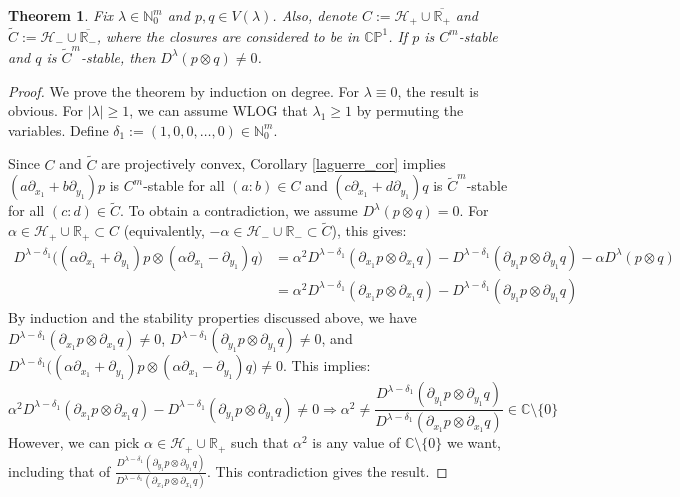 \documentclass{article}
\newtheorem{theorem}{Theorem}[section]
\theoremstyle{definition}
\theoremstyle{plain}
\newcommand{\C}{\mathbb{C}}
\newcommand{\R}{\mathbb{R}}
\newcommand{\N}{\mathbb{N}}
\newcommand{\CP}{\mathbb{CP}}
\newcommand{\UHP}{\mathcal{H}_+}
\newcommand{\LHP}{\mathcal{H}_-}
\begin{document}
\begin{theorem}\label{graces_thm}
    Fix $\lambda \in \N_0^m$ and $p,q \in V(\lambda)$. Also, denote $C := \UHP \cup \overline{\R_+}$ and $\widetilde{C} := \LHP \cup \overline{\R_-}$, where the closures are considered to be in $\CP^1$. If $p$ is $C^m$-stable and $q$ is $\widetilde{C}^m$-stable, then $D^\lambda(p \otimes q) \neq 0$.
\end{theorem}
\begin{proof}
    We prove the theorem by induction on degree. For $\lambda \equiv 0$, the result is obvious. For $|\lambda| \geq 1$, we can assume WLOG that $\lambda_1 \geq 1$ by permuting the variables. Define $\delta_1 := (1,0,0,\ldots,0) \in \N_0^m$.
    
    Since $C$ and $\widetilde{C}$ are projectively convex, Corollary \ref{laguerre_cor} implies $(a\partial_{x_1} + b\partial_{y_1})p$ is $C^m$-stable for all $(a:b) \in C$ and $(c\partial_{x_1} + d\partial_{y_1})q$ is $\widetilde{C}^m$-stable for all $(c:d) \in \widetilde{C}$. To obtain a contradiction, we assume $D^\lambda(p \otimes q) = 0$. For $\alpha \in \UHP \cup \R_+ \subset C$ (equivalently, $-\alpha \in \LHP \cup \R_- \subset \widetilde{C}$), this gives:
    \[
        \begin{split}
            D^{\lambda-\delta_1}\big((\alpha \partial_{x_1} + \partial_{y_1})p \otimes (\alpha \partial_{x_1} - \partial_{y_1})q\big) &= \alpha^2 D^{\lambda-\delta_1}(\partial_{x_1} p \otimes \partial_{x_1} q) - D^{\lambda-\delta_1}(\partial_{y_1} p \otimes \partial_{y_1} q) - \alpha D^\lambda(p \otimes q) \\
                &= \alpha^2 D^{\lambda-\delta_1}(\partial_{x_1} p \otimes \partial_{x_1} q) - D^{\lambda-\delta_1}(\partial_{y_1} p \otimes \partial_{y_1} q)
        \end{split}
    \]
    By induction and the stability properties discussed above, we have $D^{\lambda-\delta_1}(\partial_{x_1} p \otimes \partial_{x_1} q) \neq 0$, $D^{\lambda-\delta_1}(\partial_{y_1} p \otimes \partial_{y_1} q) \neq 0$, and $D^{\lambda-\delta_1}\big((\alpha \partial_{x_1} + \partial_{y_1})p \otimes (\alpha \partial_{x_1} - \partial_{y_1})q\big) \neq 0$. This implies:
    \[
        \alpha^2 D^{\lambda-\delta_1}(\partial_{x_1} p \otimes \partial_{x_1} q) - D^{\lambda-\delta_1}(\partial_{y_1} p \otimes \partial_{y_1} q) \neq 0 \Longrightarrow \alpha^2 \neq \frac{D^{\lambda-\delta_1}(\partial_{y_1} p \otimes \partial_{y_1} q)}{D^{\lambda-\delta_1}(\partial_{x_1} p \otimes \partial_{x_1} q)} \in \C \setminus \{0\}
    \]
    However, we can pick $\alpha \in \UHP \cup \R_+$ such that $\alpha^2$ is any value of $\C \setminus \{0\}$ we want, including that of $\frac{D^{\lambda-\delta_1}(\partial_{y_1} p \otimes \partial_{y_1} q)}{D^{\lambda-\delta_1}(\partial_{x_1} p \otimes \partial_{x_1} q)}$. This contradiction gives the result.
\end{proof}
\end{document}
